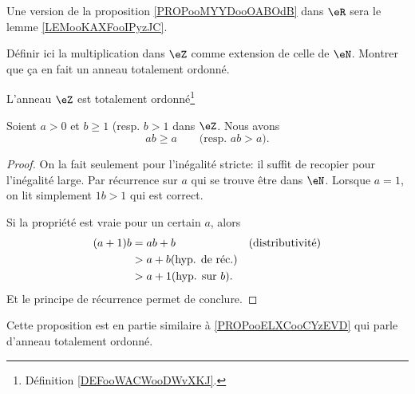 \begin{normaltext}	\label{NORMooOrdreEntiersRelatifsExtension}
	Une version de la proposition \ref{PROPooMYYDooOABOdB} dans \( \eR\) sera le lemme \ref{LEMooKAXFooIPyzJC}.
\end{normaltext}

\begin{probleme}	\label{TODOooDefinirMultiplicationRelatifs}
	Définir ici la multiplication dans \( \eZ \) comme extension de celle de \( \eN \). Montrer que ça en fait un anneau totalement ordonné.
\end{probleme}

\begin{proposition}	\label{PROPooADGIooTioqdu}
	L'anneau \( \eZ\) est totalement ordonné\footnote{Définition \ref{DEFooWACWooDWvXKJ}.}
\end{proposition}

\begin{lemma}       \label{LEMooSVDDooWsyxNP}
	Soient \( a>0\) et \( b \geq 1\) (resp. \( b > 1 \) dans \( \eZ\). Nous avons
	\begin{equation}
		ab \geq a \qquad \text{(resp. }ab>a\text{)}.
	\end{equation}
\end{lemma}

\begin{proof}
	On la fait seulement pour l'inégalité stricte: il suffit de recopier pour l'inégalité large. Par récurrence sur \( a \) qui se trouve être dans \( \eN \). Lorsque \( a = 1 \), on lit simplement \( 1b > 1 \) qui est correct.

	Si la propriété est vraie pour un certain \( a \), alors
	\begin{align}
		(a+1) b & = ab + b                          &  & \text{(distributivité)} \\
		        & > a + b\text{(hyp. de réc.)}                                   \\
		        & > a + 1\text{(hyp. sur \( b \)).}
	\end{align}
	Et le principe de récurrence permet de conclure.
\end{proof}

\begin{normaltext}	\label{NORMooLienRelatifsAnnTotOrdonne}
	Cette proposition est en partie similaire à \ref{PROPooELXCooCYzEVD} qui parle d'anneau totalement ordonné.
\end{normaltext}

